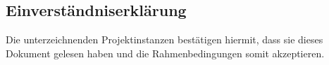 \subsection{Einverständniserklärung}
Die unterzeichnenden Projektinstanzen bestätigen hiermit, dass sie dieses Dokument gelesen haben und die Rahmenbedingungen somit
akzeptieren.